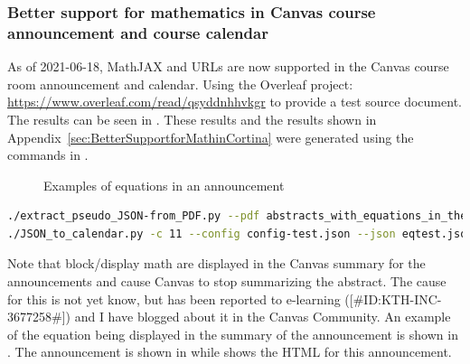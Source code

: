 \subsubsection{Better support for mathematics in Canvas course announcement and course calendar}
\label{sec:betterSupportMathInCortinaAndCourseCalendar}
As of 2021-06-18, MathJAX and URLs are now supported in the Canvas course room announcement and calendar.
Using the Overleaf project: \url{https://www.overleaf.com/read/qsyddnhhvkgr} to provide a test source document. The results can be seen in . These results and the results shown in Appendix~\ref{sec:BetterSupportforMathinCortina} were generated using the commands in .
\begin{figure}[!ht]
  \begin{center}
  \end{center}
  \caption{Examples of equations in an announcement}
  \label{fig:equationsInAnnouncement}
\end{figure}
\FloatBarrier
{}
\begin{lstlisting}[language={bash}, caption={Commands to produce the JSON and make the calendar entries and announcement}, label=lst:jsonToCalendar3]
./extract_pseudo_JSON-from_PDF.py --pdf abstracts_with_equations_in_them.pdf --json eqtest.json
./JSON_to_calendar.py -c 11 --config config-test.json --json eqtest.json
\end{lstlisting}

\FloatBarrier

Note that block/display math are displayed in the Canvas summary for the announcements and cause Canvas to stop summarizing the abstract. The cause for this is not yet know, but has been reported to e-learning ([\#ID:KTH-INC-3677258\#]) and I have blogged about it in the Canvas Community. An example of the equation being displayed in the summary of the announcement is shown in . The announcement is shown in  while  shows the HTML for this announcement.

